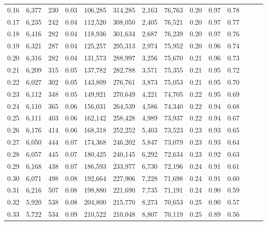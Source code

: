 \begin{tabular}{rrrrrrrrrrrrrr}
0.16 &   6,377 &    230 &  0.03 &  106,285 &  314,285 &   2,163 &  76,763 &  0.20 &  0.97 &      0.78 \\
0.17 &   6,235 &    242 &  0.04 &  112,520 &  308,050 &   2,405 &  76,521 &  0.20 &  0.97 &      0.77 \\
0.18 &   6,416 &    282 &  0.04 &  118,936 &  301,634 &   2,687 &  76,239 &  0.20 &  0.97 &      0.76 \\
0.19 &   6,321 &    287 &  0.04 &  125,257 &  295,313 &   2,974 &  75,952 &  0.20 &  0.96 &      0.74 \\
0.20 &   6,316 &    282 &  0.04 &  131,573 &  288,997 &   3,256 &  75,670 &  0.21 &  0.96 &      0.73 \\
0.21 &   6,209 &    315 &  0.05 &  137,782 &  282,788 &   3,571 &  75,355 &  0.21 &  0.95 &      0.72 \\
0.22 &   6,027 &    302 &  0.05 &  143,809 &  276,761 &   3,873 &  75,053 &  0.21 &  0.95 &      0.70 \\
0.23 &   6,112 &    348 &  0.05 &  149,921 &  270,649 &   4,221 &  74,705 &  0.22 &  0.95 &      0.69 \\
0.24 &   6,110 &    365 &  0.06 &  156,031 &  264,539 &   4,586 &  74,340 &  0.22 &  0.94 &      0.68 \\
0.25 &   6,111 &    403 &  0.06 &  162,142 &  258,428 &   4,989 &  73,937 &  0.22 &  0.94 &      0.67 \\
0.26 &   6,176 &    414 &  0.06 &  168,318 &  252,252 &   5,403 &  73,523 &  0.23 &  0.93 &      0.65 \\
0.27 &   6,050 &    444 &  0.07 &  174,368 &  246,202 &   5,847 &  73,079 &  0.23 &  0.93 &      0.64 \\
0.28 &   6,057 &    445 &  0.07 &  180,425 &  240,145 &   6,292 &  72,634 &  0.23 &  0.92 &      0.63 \\
0.29 &   6,168 &    438 &  0.07 &  186,593 &  233,977 &   6,730 &  72,196 &  0.24 &  0.91 &      0.61 \\
0.30 &   6,071 &    498 &  0.08 &  192,664 &  227,906 &   7,228 &  71,698 &  0.24 &  0.91 &      0.60 \\
0.31 &   6,216 &    507 &  0.08 &  198,880 &  221,690 &   7,735 &  71,191 &  0.24 &  0.90 &      0.59 \\
0.32 &   5,920 &    538 &  0.08 &  204,800 &  215,770 &   8,273 &  70,653 &  0.25 &  0.90 &      0.57 \\
0.33 &   5,722 &    534 &  0.09 &  210,522 &  210,048 &   8,807 &  70,119 &  0.25 &  0.89 &      0.56 \\

\end{tabular}
